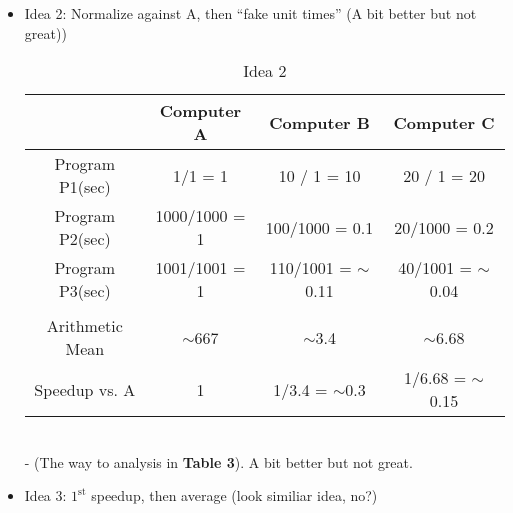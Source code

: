 \documentclass[12pt]{article}
\begin{document}
\begin{itemize}
\begin{itemize}
                                \item {Idea 2: Normalize against A, then “fake unit times” (A bit better but not great))}
                                    \begin{table}[]
                                        \centering
                                        \begin{tabular}{cccc}
\hline
\multicolumn{1}{|c|}{}                & \multicolumn{1}{c|}{Computer A}    & \multicolumn{1}{c|}{Computer B}            & \multicolumn{1}{c|}{Computer C}           \\ \hline
\multicolumn{1}{|c|}{Program P1(sec)} & \multicolumn{1}{c|}{1/1 = 1}       & \multicolumn{1}{c|}{10 / 1 = 10}           & \multicolumn{1}{c|}{20 / 1 = 20}          \\ \hline
\multicolumn{1}{|c|}{Program P2(sec)} & \multicolumn{1}{c|}{1000/1000 = 1} & \multicolumn{1}{c|}{100/1000 = 0.1}        & \multicolumn{1}{c|}{20/1000 = 0.2}        \\ \hline
\multicolumn{1}{|c|}{Program P3(sec)} & \multicolumn{1}{c|}{1001/1001 = 1} & \multicolumn{1}{c|}{110/1001 = $\sim$0.11} & \multicolumn{1}{c|}{40/1001 = $\sim$0.04} \\ \hline
                                      &                                    &                                            &                                           \\ \hline
\multicolumn{1}{|c|}{Arithmetic Mean} & \multicolumn{1}{c|}{$\sim$667}     & \multicolumn{1}{c|}{$\sim$3.4}             & \multicolumn{1}{c|}{$\sim$6.68}           \\ \hline
\multicolumn{1}{|c|}{Speedup vs. A}   & \multicolumn{1}{c|}{1}             & \multicolumn{1}{c|}{1/3.4 = $\sim$0.3}     & \multicolumn{1}{c|}{1/6.68 = $\sim$0.15}  \\ \hline
\end{tabular}
                                        \caption{Idea 2}
                                        \label{tab:my_label}
                                    \end{table}
                                    \\- (The way to analysis in \textbf{Table 3}). A bit better but not great.
                                \item {Idea 3: $1^{\text{st}}$ speedup, then average (look similiar idea, no?)}
                                    \begin{table}[]
                                        \centering

\end{table}
\end{itemize}
\end{itemize}
\end{document}
